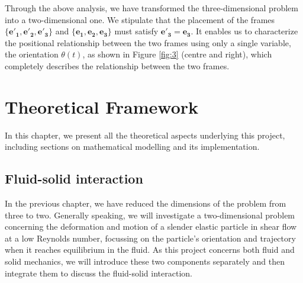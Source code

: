 \documentclass[12pt,MSc,twoside]{muthesis_2020}
\begin{document}
Through the above analysis, we have transformed the three-dimensional problem into a two-dimensional one. We stipulate that the placement of the frames $\{\mathbf{e'_1},\mathbf{e'_2},\mathbf{e'_3}\}$ and $\{\mathbf{e_1},\mathbf{e_2},\mathbf{e_3}\}$ must satisfy $\mathbf{e'_3}=\mathbf{e_3}$. It enables us to characterize the positional relationship between the two frames using only a single variable, the orientation $\theta(t)$, as shown in Figure \ref{fig:3} (centre and right), which completely describes the relationship between the two frames.




\chapter{Theoretical Framework}
In this chapter, we present all the theoretical aspects underlying this project, including sections on mathematical modelling and its implementation.

\section{Fluid-solid interaction}
In the previous chapter, we have reduced the dimensions of the problem from three to two. Generally speaking, we will investigate a two-dimensional problem concerning the deformation and motion of a slender elastic particle in shear flow at a low Reynolds number, focussing on the particle's orientation and trajectory when it reaches equilibrium in the fluid. As this project concerns both fluid and solid mechanics, we will introduce these two components separately and then integrate them to discuss the fluid-solid interaction.
\end{document}
